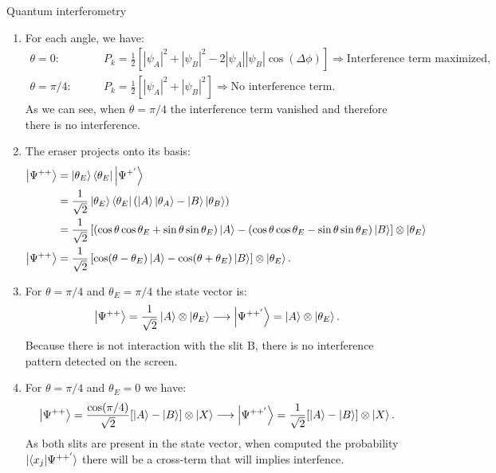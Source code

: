 \begin{example}{Quantum interferometry}
\begin{enumerate}[itemsep=0pt,topsep=0pt,parsep=0pt,label=\alph*)]
  \begin{align*}
    P_k=|\braket{x_k|\Psi^{+'}}|^2=\frac{1}{2}\left[|\psi_A|^2+|\psi_B|^2-2\cos2\theta|\psi_A||\psi_B|\cos(\Delta\phi)\right],\quad\Delta\phi=\theta_B-\theta_A.
  \end{align*}
  \item For each angle, we have:
  \begin{align*}
    \theta=0:&\qquad P_k=\frac{1}{2}\left[|\psi_A|^2+|\psi_B|^2-2|\psi_A||\psi_B|\cos(\Delta\phi)\right]\Longrightarrow\text{Interference term maximized},\\
    \theta=\pi/4:&\qquad P_k=\frac{1}{2}\left[|\psi_A|^2+|\psi_B|^2\right]\Longrightarrow\text{No interference term}.
  \end{align*}
  As we can see, when $\theta=\pi/4$ the interference term vanished and therefore there is no interference.
  \item The eraser projects onto its basis:
  \begin{align*}
    \left|\Psi^{++}\right\rangle&=\left|\theta_E\right\rangle\left\langle\theta_E\right|\left|\Psi^{+'}\right\rangle\\
    &=\frac{1}{\sqrt{2}}\left|\theta_E\right\rangle\left\langle\theta_E\right|(\left|A\right\rangle\left|\theta_A\right\rangle-\left|B\right\rangle\left|\theta_B\right\rangle)\\
    &=\frac{1}{\sqrt{2}}\left[(\cos\theta\cos\theta_E+\sin\theta\sin\theta_E)\left|A\right\rangle-(\cos\theta\cos\theta_E-\sin\theta\sin\theta_E)\left|B\right\rangle\right]\otimes\left|\theta_E\right\rangle\\
    \left|\Psi^{++}\right\rangle&=\frac{1}{\sqrt{2}}\left[\cos(\theta-\theta_E)\left|A\right\rangle-\cos(\theta+\theta_E)\left|B\right\rangle\right]\otimes\left|\theta_E\right\rangle.
  \end{align*}
  \item For $\theta=\pi/4$ and $\theta_E=\pi/4$ the state vector is:
  \begin{align*}
    \left|\Psi^{++}\right\rangle=\frac{1}{\sqrt{2}}\left|A\right\rangle\otimes\left|\theta_E\right\rangle\longrightarrow\left|\Psi^{++'}\right\rangle=\left|A\right\rangle\otimes\left|\theta_E\right\rangle.
  \end{align*}
  Because there is not interaction with the slit B, there is no interference pattern detected on the screen.
  \item For $\theta=\pi/4$ and $\theta_E=0$ we have:
  \begin{align*}
    \left|\Psi^{++}\right\rangle=\frac{\cos(\pi/4)}{\sqrt{2}}[\left|A\right\rangle-\left|B\right\rangle]\otimes\left|X\right\rangle\longrightarrow\left|\Psi^{++'}\right\rangle=\frac{1}{\sqrt{2}}[\left|A\right\rangle-\left|B\right\rangle]\otimes\left|X\right\rangle.
  \end{align*} 
  As both slits are present in the state vector, when computed the probability $|\langle x_j|\Psi^{++'}\rangle$ there will be a cross-term that will implies interfence.
\end{enumerate}
\end{example}